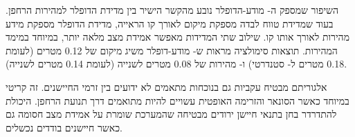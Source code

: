 השיפור שמספק ה- מודע-הדופלר נובע מהקשר הישיר בין מדידת הדופלר למהירות הרחפן. בעוד שמדידת טווח לבדה מספקת מיקום לאורך קו הראייה, מדידת הדופלר מספקת מידע מהירות לאורך אותו קו. שילוב שתי המדידות מאפשר אמידת מצב מלאה יותר, במיוחד במימד המהירות. תוצאות סימולציה מראות ש- מודע-דופלר משיג  מיקום של 0.12 מטרים (לעומת 0.18 מטרים ל- סטנדרטי) ו- מהירות של 0.08 מטרים לשנייה (לעומת 0.14 מטרים לשנייה).

אלגוריתם  מבטיח עקביות גם בנוכחות מתאמים לא ידועים בין זרמי החיישנים. זה קריטי במיוחד כאשר הסונאר והזרימה האופטית עשויים להיות מתואמים דרך תנועת הרחפן. היכולת להתדרדר בחן בתנאי חיישן ירודים מבטיחה שהמערכת שומרת על אמידת מצב חסומה גם כאשר חיישנים בודדים נכשלים.

\cite{Chen2020BioSonar}
\cite{Rihaczek1969MatchedFilter}